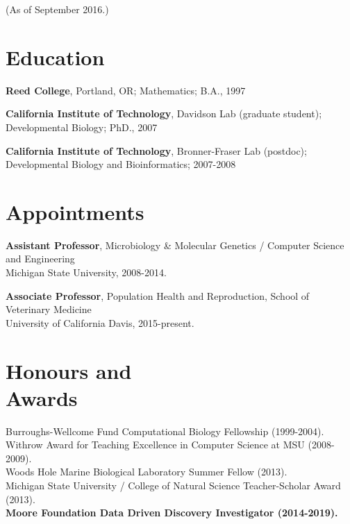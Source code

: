\documentclass[margin,line]{resume}
\begin{document}
\pagestyle{plain}


\begin{resume}



    {\small (As of September 2016.)}

    \section{\mysidestyle Education}

    {\bf Reed College}, Portland, OR; Mathematics; B.A., 1997

    \vspace{2mm}

    {\bf California Institute of Technology}, Davidson Lab (graduate student);
\\
Developmental Biology; PhD., 2007

    \vspace{2mm}

    {\bf California Institute of Technology}, Bronner-Fraser Lab (postdoc);\\
 Developmental Biology and Bioinformatics; 2007-2008

    \vspace{2mm}

    \section{\mysidestyle Appointments}

    {\bf Assistant Professor}, 
Microbiology \& Molecular Genetics / Computer Science and Engineering\\
Michigan State University, 2008-2014.

    {\bf Associate Professor}, 
Population Health and Reproduction, School of Veterinary Medicine \\
University of California Davis, 2015-present.

    \section{\mysidestyle Honours and\\Awards} 

Burroughs-Wellcome Fund Computational Biology Fellowship (1999-2004).\\
Withrow Award for Teaching Excellence in Computer Science at MSU (2008-2009). \\
Woods Hole Marine Biological Laboratory Summer Fellow (2013).\\
Michigan State University / College of Natural Science Teacher-Scholar Award (2013).\\
{\bf Moore Foundation Data Driven Discovery Investigator (2014-2019).}



\end{resume}
\end{document}
